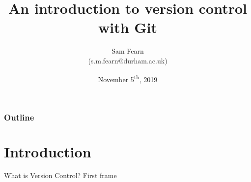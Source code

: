 \documentclass{beamer}
\author{Sam Fearn\\{\small 
(s.m.fearn@durham.ac.uk)}}
\title{An introduction to version control with Git}
\date{November 5\textsuperscript{th}, 2019}
\begin{document}
\renewcommand{\d}[2][]{\ensuremath{\operatorname{d}^{#1}\!{#2}}}

{

\begin{frame}[plain]
\maketitle
\end{frame}
}

\begin{frame}
       \frametitle{Outline}
       \tableofcontents
\end{frame}
\Large
\section{Introduction} %
\label{sec:intro}

\begin{frame}{What is Version Control?}
	First frame
\end{frame}

\end{document}
